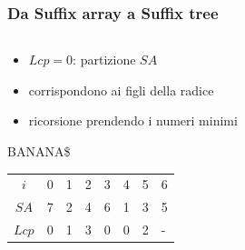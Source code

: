\begin{frame}[fragile]
\frametitle{Da Suffix array a Suffix tree}
\begin{columns}
\begin{column}{0.5\textwidth}
\begin{itemize}
\item
$Lcp = 0$:  partizione $SA$
\item
corrispondono ai figli della radice
\item
ricorsione prendendo i numeri minimi
\end{itemize}
\begin{block}{BANANA\$}
\begin{tabular}[l]{|c|l|l|l|l|l|l|l|}
\hline
$i$&0&1&2&3&4&5&6\\
$SA$&7&2&4&6&1&3&5\\
$Lcp$&0&1&3&0&0&2&-\\\hline
\end{tabular}
\end{block}
\end{column}
\begin{column}{0.5\textwidth}
\begin{center}

\end{center}
\end{column}
\end{columns}
\end{frame}
